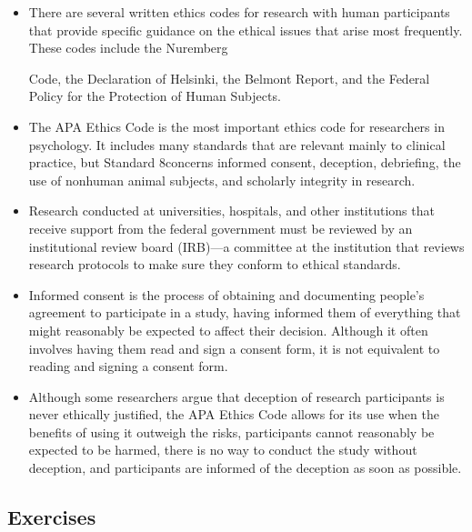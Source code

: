 \begin{fullwidth}

\begin{itemize}

\item There are several written ethics codes for research with human participants that provide specific guidance on the ethical issues that arise most frequently. These codes include the Nuremberg


Code, the Declaration of Helsinki, the Belmont Report, and the Federal Policy for the Protection
of Human Subjects.

\item The APA Ethics Code is the most important ethics code for researchers in psychology. It includes
many standards that are relevant mainly to clinical practice, but Standard 8concerns informed consent, deception, debriefing, the use of nonhuman animal subjects, and scholarly integrity in research.

\item Research conducted at universities, hospitals, and other institutions that receive support from the federal government must be reviewed by an institutional review board (IRB)---a committee at the institution that reviews research protocols to make sure they conform to ethical standards.

\item Informed consent is the process of obtaining and documenting people's agreement to participate in a study, having informed them of everything that might reasonably be expected to affect their decision. Although it often involves having them read and sign a consent form, it is not equivalent to reading and signing a consent form.

\item Although some researchers argue that deception of research participants is never ethically justified, the APA Ethics Code allows for its use when the benefits of using it outweigh the risks, participants cannot reasonably be expected to be harmed, there is no way to conduct the study without deception, and participants are informed of the deception as soon as possible.

\end{itemize}

\end{fullwidth}


\subsection{Exercises}

